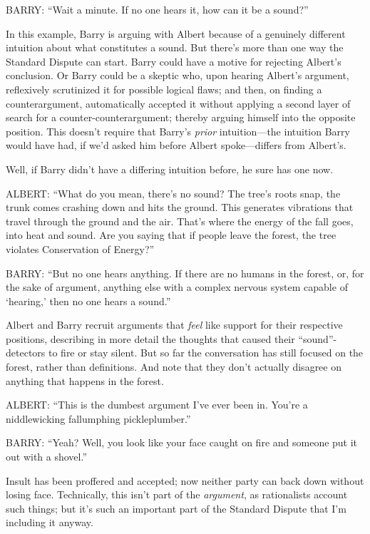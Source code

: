 {
 BARRY: ``Wait a minute. If no one hears it, how
can it be a sound?''}

{
 In this example, Barry is arguing with Albert because of a
genuinely different intuition about what constitutes a sound. But
there's more than one way the Standard Dispute can
start. Barry could have a motive for rejecting Albert's
conclusion. Or Barry could be a skeptic who, upon hearing
Albert's argument, reflexively scrutinized it for
possible logical flaws; and then, on finding a counterargument,
automatically accepted it without applying a second layer of search for
a counter-counterargument; thereby arguing himself into the opposite
position. This doesn't require that
Barry's \textit{prior} intuition---the intuition Barry
would have had, if we'd asked him before Albert
spoke---differs from Albert's.}

{
 Well, if Barry didn't have a differing intuition
before, he sure has one now.}

{
 ALBERT: ``What do you mean,
there's no sound? The tree's roots
snap, the trunk comes crashing down and hits the ground. This generates
vibrations that travel through the ground and the air.
That's where the energy of the fall goes, into heat and
sound. Are you saying that if people leave the forest, the tree
violates Conservation of Energy?''}

{
 BARRY: ``But no one hears anything. If there are
no humans in the forest, or, for the sake of argument, anything else
with a complex nervous system capable of
`hearing,' then no one hears a
sound.''}

{
 Albert and Barry recruit arguments that \textit{feel} like support
for their respective positions, describing in more detail the thoughts
that caused their
``sound''-detectors to fire or stay
silent. But so far the conversation has still focused on the forest,
rather than definitions. And note that they don't
actually disagree on anything that happens in the forest.}

{
 ALBERT: ``This is the dumbest argument
I've ever been in. You're a
niddlewicking fallumphing pickleplumber.''}

{
 BARRY: ``Yeah? Well, you look like your face
caught on fire and someone put it out with a
shovel.''}

{
 Insult has been proffered and accepted; now neither party can back
down without losing face. Technically, this isn't part
of the \textit{argument}, as rationalists account such things; but
it's such an important part of the Standard Dispute
that I'm including it anyway.}

